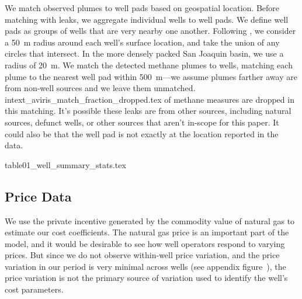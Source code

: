 We match observed plumes to well pads based on geospatial location.
Before matching with leaks, we aggregate individual wells to well pads.
We define well pads as groups of wells that are very nearby one another.
Following \textcite{Omara/Zimmerman/Sullivan/Li/Ellis/Cesa/Subramanian/Presto/Robinson:2018}, we consider a 50~m radius around each well's surface location, and take the union of any circles that intersect.
In the more densely packed San Joaquin basin, we use a radius of 20~m.
We match the detected methane plumes to wells, matching each plume to the nearest well pad within 500~m---we assume plumes farther away are from non-well sources and we leave them unmatched.
{intext_aviris_match_fraction_dropped.tex}
of methane measures are dropped in this matching.
It's possible these leaks are from other sources, including natural sources, defunct wells, or other sources that aren't in-scope for this paper.
It could also be that the well pad is not exactly at the location reported in the data.


\begin{table}[!hbtp]
\centering
{table01_well_summary_stats.tex}
\end{table}



\subsection{Price Data}
\label{sec:price-data}

We use the private incentive generated by the commodity value of natural gas to estimate our cost coefficients.
The natural gas price is an important part of the model, and it would be desirable to see how well operators respond to varying prices.
But since we do not observe within-well price variation, and the price variation in our period is very minimal across wells (see appendix figure~\iftoggle{usexr}{\ref{fig:nat-gas-price-histogram}}{A8}), the price variation is not the primary source of variation used to identify the well’s cost parameters.

